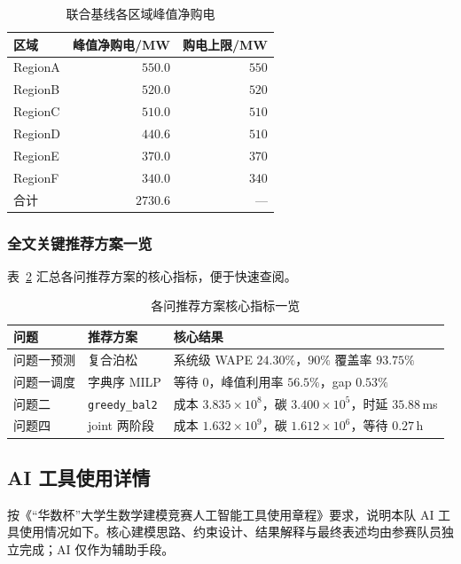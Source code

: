 \documentclass[UTF8,a4paper,zihao=-4]{ctexart}
\begin{document}
\begin{table}[H]
\centering
\small
\caption{联合基线各区域峰值净购电}
\label{tab:app-q4-peak}
\begin{tabular}{lrr}
\toprule
区域 & 峰值净购电/MW & 购电上限/MW \\
\midrule
RegionA & $550.0$ & $550$ \\
RegionB & $520.0$ & $520$ \\
RegionC & $510.0$ & $510$ \\
RegionD & $440.6$ & $510$ \\
RegionE & $370.0$ & $370$ \\
RegionF & $340.0$ & $340$ \\
\midrule
合计 & $2730.6$ & --- \\
\bottomrule
\end{tabular}
\end{table}

\subsubsection{全文关键推荐方案一览}

表~\ref{tab:app-recommend} 汇总各问推荐方案的核心指标，便于快速查阅。

\begin{table}[H]
\centering
\footnotesize
\caption{各问推荐方案核心指标一览}
\label{tab:app-recommend}
\setlength{\tabcolsep}{3.5pt}
\begin{tabular}{llp{6.2cm}}
\toprule
问题 & 推荐方案 & 核心结果 \\
\midrule
问题一预测 & 复合泊松 & 系统级 WAPE $24.30\%$，$90\%$ 覆盖率 $93.75\%$ \\
问题一调度 & 字典序 MILP & 等待 $0$，峰值利用率 $56.5\%$，gap $0.53\%$ \\
问题二 & \texttt{greedy\_bal2} & 成本 $3.835\times10^8$，碳 $3.400\times10^5$，时延 $35.88$\,ms \\
问题四 & joint 两阶段 & 成本 $1.632\times10^9$，碳 $1.612\times10^6$，等待 $0.27$\,h \\
\bottomrule
\end{tabular}
\end{table}

\subsection{AI 工具使用详情}
\label{app:ai-usage}

按《“华数杯”大学生数学建模竞赛人工智能工具使用章程》要求，说明本队 AI 工具使用情况如下。核心建模思路、约束设计、结果解释与最终表述均由参赛队员独立完成；AI 仅作为辅助手段。
\end{document}
